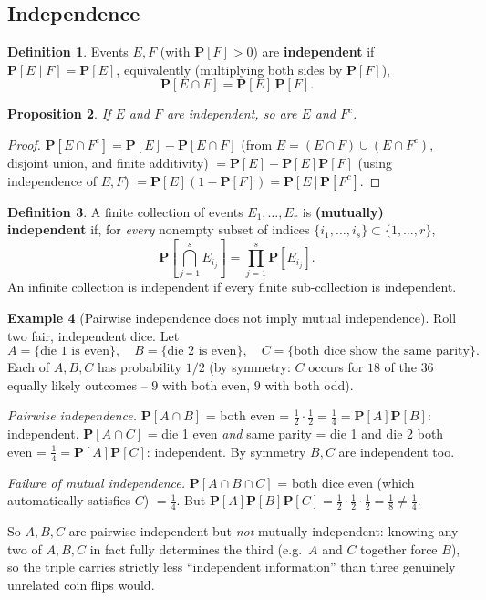 \documentclass[11pt]{article}
\theoremstyle{definition}
\newtheorem{definition}{Definition}[section]
\newtheorem{example}[definition]{Example}
\theoremstyle{plain}
\newtheorem{proposition}[definition]{Proposition}
\theoremstyle{remark}
\begin{document}
\subsection{Independence}

\begin{definition}
Events $E,F$ (with $\mathbf{P}[F]>0$) are \textbf{independent} if $\mathbf{P}[E\mid F]=\mathbf{P}[E]$,
equivalently (multiplying both sides by $\mathbf{P}[F]$),
\[
\mathbf{P}[E\cap F] = \mathbf{P}[E]\,\mathbf{P}[F].
\]
\end{definition}

\begin{proposition}
If $E$ and $F$ are independent, so are $E$ and $F^c$.
\end{proposition}
\begin{proof}
$\mathbf{P}[E\cap F^c] = \mathbf{P}[E] - \mathbf{P}[E\cap F]$ (from $E = (E\cap F)\cup(E\cap F^c)$,
disjoint union, and finite additivity) $= \mathbf{P}[E] - \mathbf{P}[E]\mathbf{P}[F]$ (using
independence of $E,F$) $= \mathbf{P}[E](1-\mathbf{P}[F]) = \mathbf{P}[E]\mathbf{P}[F^c]$.
\end{proof}

\begin{definition}
A finite collection of events $E_1,\dots,E_r$ is \textbf{(mutually) independent} if, for
\emph{every} nonempty subset of indices $\{i_1,\dots,i_s\}\subset\{1,\dots,r\}$,
\[
\mathbf{P}\!\left[\bigcap_{j=1}^s E_{i_j}\right] = \prod_{j=1}^s \mathbf{P}[E_{i_j}].
\]
An infinite collection is independent if every finite sub-collection is independent.
\end{definition}

\begin{example}[Pairwise independence does not imply mutual independence]
\label{ex:pairwise-not-mutual}
Roll two fair, independent dice. Let
\[
A = \{\text{die 1 is even}\}, \quad B=\{\text{die 2 is even}\}, \quad
C=\{\text{both dice show the same parity}\}.
\]
Each of $A,B,C$ has probability $1/2$ (by symmetry: $C$ occurs for $18$ of the $36$ equally likely
outcomes -- $9$ with both even, $9$ with both odd).

\emph{Pairwise independence.} $\mathbf{P}[A\cap B]$ = both even = $\tfrac12\cdot\tfrac12=\tfrac14 =
\mathbf{P}[A]\mathbf{P}[B]$: independent. $\mathbf{P}[A\cap C]$ = die 1 even \emph{and} same parity
= die 1 and die 2 both even = $\tfrac14 = \mathbf{P}[A]\mathbf{P}[C]$: independent. By symmetry
$B,C$ are independent too.

\emph{Failure of mutual independence.} $\mathbf{P}[A\cap B\cap C]$ = both dice even (which
automatically satisfies $C$) $=\tfrac14$. But $\mathbf{P}[A]\mathbf{P}[B]\mathbf{P}[C] =
\tfrac12\cdot\tfrac12\cdot\tfrac12=\tfrac18 \ne \tfrac14$.

So $A,B,C$ are pairwise independent but \emph{not} mutually independent: knowing any two of $A,B,C$
in fact fully determines the third (e.g.\ $A$ and $C$ together force $B$), so the triple carries
strictly less ``independent information'' than three genuinely unrelated coin flips would.
\end{example}
\end{document}
